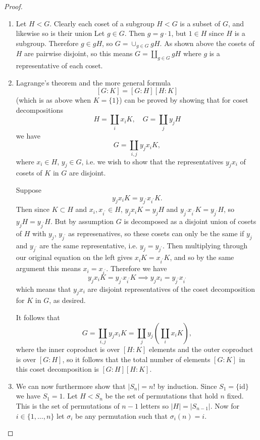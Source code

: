 \begin{proof}

\begin{enumerate}
  \item{
    Let $H < G$.
    Clearly each coset of a subgroup $H < G$ is a subset of $G$, and
    likewise so is their union Let
    $g \in G$. Then $g = g \cdot 1$, but $1 \in H$ since $H$ is a
    subgroup. Therefore $g \in gH$, so
    $G = \cup_{g \in G} gH$.
    As shown above the cosets of $H$
    are pairwise disjoint, so this means $G = \coprod_{g \in G} gH$
    where $g$ is a representative of each coset.
  }
  \item{
    Lagrange's theorem and the more general formula
    $$
    [G : K] = [G : H] [H : K]
    $$
    (which is as above when $K = \{ 1 \}$) can be proved by showing
    that for coset decompositions
    $$
    H = \coprod_i x_i K, \quad
    G = \coprod_j y_j H
    $$
    we have
    $$
    G = \coprod_{i,j} y_j x_i K,
    $$
    where $x_i \in H$, $y_j \in G$, i.e. we wish to show that
    the representatives $y_j x_i$ of cosets of $K$ in $G$ are
    disjoint.

    Suppose
    $$
    y_j x_i K = y_{j^\prime} x_{i^\prime} K.
    $$
    Then since $K \subset H$ and $x_i, x_{i^\prime} \in H$,
    $y_j x_i K = y_j H$ and
    $y_{j^\prime} x_{i^\prime} K = y_{j^\prime} H$, so
    $y_j H = y_{j^\prime} H$. But by assumption $G$ is decomposed as a
    disjoint union of cosets of $H$ with $y_j$, $y_{j^\prime}$ as
    represenatives, so these cosets can only
    be the same if $y_j$ and $y_{j^\prime}$ are the same
    representative, i.e. $y_j = y_{j^\prime}$. Then multiplying
    through our original equation on the left gives
    $x_i K = x_{i^\prime} K$, and so by the same argument this means
    $x_i = x_{i^\prime}$. Therefore we have
    $$
    y_j x_i K = y_{j^\prime} x_{i^\prime} K
    \implies
    y_j x_i = y_{j^\prime} x_{i^\prime}
    $$
    which means that $y_j x_i$ are disjoint representatives of the
    coset decomposition for $K$ in $G$, as desired.

    It follows that
    $$
    G = \coprod_{i,j} y_j x_i K
      = \coprod_j y_j \left( \coprod_i x_i K \right),
    $$
    where the inner coproduct is over $[H : K]$ elements and the
    outer coproduct is over $[G : H]$, so it follows that the total
    number of elements $[G : K]$ in this coset decomposition is
    $[G : H][H : K]$.
  }
  \item{
    We can now furthermore show that $|S_n| = n!$ by
    induction. Since $S_1 = \{ \mathrm{id} \}$ we have
    $S_1 = 1$. Let $H < S_n$ be the set of permutations that hold $n$
    fixed. This is the set of permutations of $n-1$ letters so
    $|H| = |S_{n-1}|$. Now for $i \in \{1, \dots, n\}$ let $\sigma_i$
    be any permutation such that $\sigma_i(n) = i$.

}
\end{enumerate}
\end{proof}
